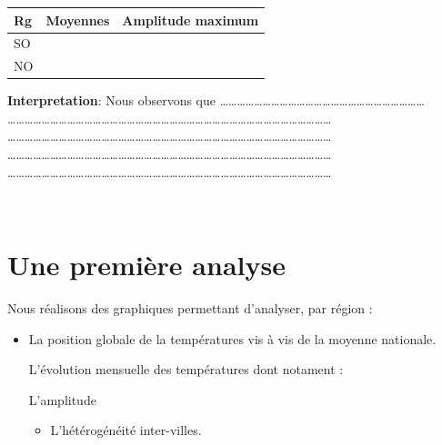\documentclass[
]{article}
\providecommand{\tightlist}{%
  \setlength{\itemsep}{0pt}\setlength{\parskip}{0pt}}
\begin{document}
\begin{longtable}[]{@{}lll@{}}
\toprule
Rg & Moyennes & Amplitude maximum\tabularnewline
\midrule
\endhead
SO & &\tabularnewline
NO & &\tabularnewline
\bottomrule
\end{longtable}

\textbf{Interpretation}: Nous observons que
\ldots\ldots\ldots\ldots\ldots\ldots\ldots\ldots\ldots\ldots\ldots\ldots\ldots\ldots\ldots\ldots\ldots\ldots\ldots\ldots\ldots\ldots\ldots\ldots{}\\
\ldots\ldots\ldots\ldots\ldots\ldots\ldots\ldots\ldots\ldots\ldots\ldots\ldots\ldots\ldots\ldots\ldots\ldots\ldots\ldots\ldots\ldots\ldots\ldots\ldots\ldots\ldots\ldots\ldots\ldots\ldots\ldots\ldots\ldots\ldots\ldots\ldots\ldots{}
\ldots\ldots\ldots\ldots\ldots\ldots\ldots\ldots\ldots\ldots\ldots\ldots\ldots\ldots\ldots\ldots\ldots\ldots\ldots\ldots\ldots\ldots\ldots\ldots\ldots\ldots\ldots\ldots\ldots\ldots\ldots\ldots\ldots\ldots\ldots\ldots\ldots\ldots{}
\ldots\ldots\ldots\ldots\ldots\ldots\ldots\ldots\ldots\ldots\ldots\ldots\ldots\ldots\ldots\ldots\ldots\ldots\ldots\ldots\ldots\ldots\ldots\ldots\ldots\ldots\ldots\ldots\ldots\ldots\ldots\ldots\ldots\ldots\ldots\ldots\ldots\ldots{}
\ldots\ldots\ldots\ldots\ldots\ldots\ldots\ldots\ldots\ldots\ldots\ldots\ldots\ldots\ldots\ldots\ldots\ldots\ldots\ldots\ldots\ldots\ldots\ldots\ldots\ldots\ldots\ldots\ldots\ldots\ldots\ldots\ldots\ldots\ldots\ldots\ldots\ldots{}

~

\hypertarget{une-premiuxe8re-analyse}{%
\section{\texorpdfstring{\textbf{Une première analyse
}}{Une première analyse }}\label{une-premiuxe8re-analyse}}

Nous réalisons des graphiques permettant d'analyser, par région :

\begin{itemize}
\item
  La position globale de la températures vis à vis de la moyenne
  nationale.

  L'évolution mensuelle des températures dont notament :

  L'amplitude

  \begin{itemize}
  \tightlist
  \item
    L'hétérogénéité inter-villes.
  \end{itemize}
\end{itemize}
\end{document}

